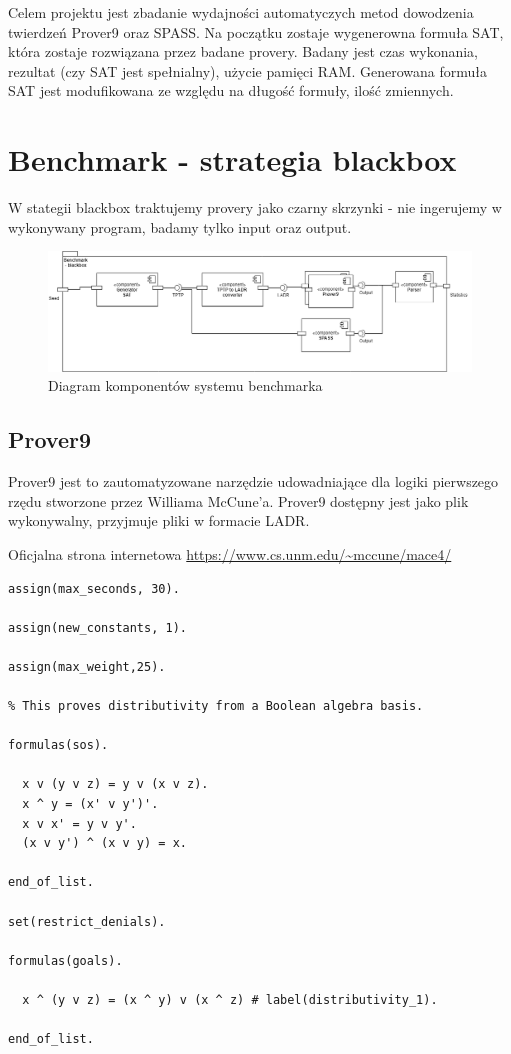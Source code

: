 \documentclass[a4paper,12pt]{article}
\begin{document}
Celem projektu jest zbadanie wydajności automatyczych metod dowodzenia twierdzeń Prover9 oraz SPASS. Na początku zostaje wygenerowna formuła \gls{SAT}, która zostaje rozwiązana przez badane provery. Badany jest czas wykonania, rezultat (czy SAT jest spełnialny), użycie pamięci RAM.
Generowana formuła SAT jest modufikowana ze względu na długość formuły, ilość zmiennych.

\section{Benchmark - strategia blackbox}

W stategii blackbox traktujemy provery jako czarny skrzynki - nie ingerujemy w wykonywany program, badamy tylko input oraz output.

\begin{figure}[!htb]
  \includegraphics[scale=0.4]{images/studio-projektowe1.png}
  \caption{Diagram komponentów systemu benchmarka}
\end{figure}
\newpage

\subsection{Prover9}

Prover9 jest to zautomatyzowane narzędzie udowadniające dla logiki pierwszego rzędu stworzone przez Williama McCune’a.
\newline
Prover9 dostępny jest jako plik wykonywalny, przyjmuje pliki w formacie \gls{LADR}.

Oficjalna strona internetowa \url{https://www.cs.unm.edu/~mccune/mace4/}


\begin{lstlisting}[caption={Przykład pliku w składni LADR}]
assign(max_seconds, 30).

assign(new_constants, 1).

assign(max_weight,25).

% This proves distributivity from a Boolean algebra basis.

formulas(sos).

  x v (y v z) = y v (x v z).
  x ^ y = (x' v y')'.
  x v x' = y v y'.
  (x v y') ^ (x v y) = x.

end_of_list.

set(restrict_denials).

formulas(goals).

  x ^ (y v z) = (x ^ y) v (x ^ z) # label(distributivity_1).

end_of_list.
\end{lstlisting}
\end{document}
